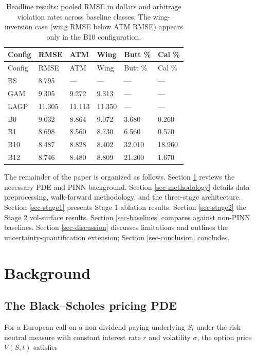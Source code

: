 \documentclass[
  11pt,
]{article}
\begin{document}
\begin{longtable}[]{@{}llllll@{}}
\caption{Headline results: pooled RMSE in dollars and arbitrage
violation rates across baseline classes. The wing-inversion case (wing
RMSE below ATM RMSE) appears only in the B10
configuration.}\label{tbl-headline}\tabularnewline
\toprule\noalign{}
Config & RMSE & ATM & Wing & Butt \% & Cal \% \\
\midrule\noalign{}
\endfirsthead
\toprule\noalign{}
Config & RMSE & ATM & Wing & Butt \% & Cal \% \\
\midrule\noalign{}
\endhead
\bottomrule\noalign{}
\endlastfoot
BS & 8.795 & --- & --- & --- & --- \\
GAM & 9.305 & 9.272 & 9.313 & --- & --- \\
LAGP & 11.305 & 11.113 & 11.350 & --- & --- \\
B0 & 9.032 & 8.864 & 9.072 & 3.680 & 0.260 \\
B1 & 8.698 & 8.560 & 8.730 & 6.560 & 0.570 \\
B10 & 8.487 & 8.828 & 8.402 & 32.010 & 18.960 \\
B12 & 8.746 & 8.480 & 8.809 & 21.200 & 1.670 \\
\end{longtable}

The remainder of the paper is organized as follows. Section
\ref{sec-background} reviews the necessary PDE and PINN background.
Section \ref{sec-methodology} details data preprocessing, walk-forward
methodology, and the three-stage architecture. Section \ref{sec-stage1}
presents Stage 1 ablation results. Section \ref{sec-stage2} the Stage 2
vol-surface results. Section \ref{sec-baselines} compares against
non-PINN baselines. Section \ref{sec-discussion} discusses limitations
and outlines the uncertainty-quantification extension; Section
\ref{sec-conclusion} concludes.

\pagebreak

\section{Background}\label{sec-background}

\subsection{The Black--Scholes pricing
PDE}\label{the-blackscholes-pricing-pde}

For a European call on a non-dividend-paying underlying \(S_t\) under
the risk-neutral measure with constant interest rate \(r\) and
volatility \(\sigma\), the option price \(V(S,t)\) satisfies
\end{document}
